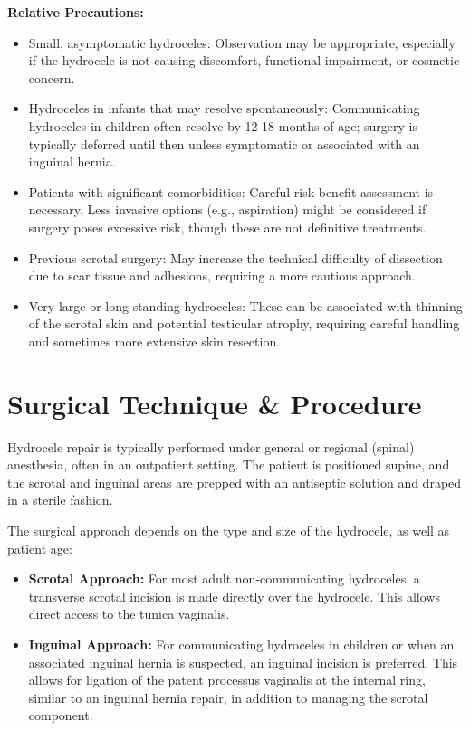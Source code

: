 \textbf{Relative Precautions:}
\begin{itemize}
  \item Small, asymptomatic hydroceles: Observation may be appropriate, especially if the hydrocele is not causing discomfort, functional impairment, or cosmetic concern.
  \item Hydroceles in infants that may resolve spontaneously: Communicating hydroceles in children often resolve by 12-18 months of age; surgery is typically deferred until then unless symptomatic or associated with an inguinal hernia.
  \item Patients with significant comorbidities: Careful risk-benefit assessment is necessary. Less invasive options (e.g., aspiration) might be considered if surgery poses excessive risk, though these are not definitive treatments.
  \item Previous scrotal surgery: May increase the technical difficulty of dissection due to scar tissue and adhesions, requiring a more cautious approach.
  \item Very large or long-standing hydroceles: These can be associated with thinning of the scrotal skin and potential testicular atrophy, requiring careful handling and sometimes more extensive skin resection.
\end{itemize}

\section*{Surgical Technique \& Procedure}
Hydrocele repair is typically performed under general or regional (spinal) anesthesia, often in an outpatient setting. The patient is positioned supine, and the scrotal and inguinal areas are prepped with an antiseptic solution and draped in a sterile fashion.

The surgical approach depends on the type and size of the hydrocele, as well as patient age:
\begin{itemize}
  \item \textbf{Scrotal Approach:} For most adult non-communicating hydroceles, a transverse scrotal incision is made directly over the hydrocele. This allows direct access to the tunica vaginalis.
  \item \textbf{Inguinal Approach:} For communicating hydroceles in children or when an associated inguinal hernia is suspected, an inguinal incision is preferred. This allows for ligation of the patent processus vaginalis at the internal ring, similar to an inguinal hernia repair, in addition to managing the scrotal component.
\end{itemize}

